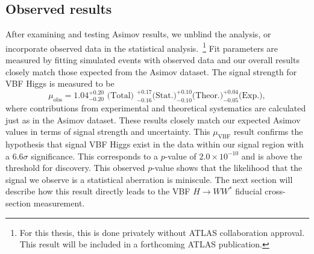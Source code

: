 \subsection{Observed results}
After examining and testing Asimov results, we unblind the analysis, or incorporate observed data in the statistical analysis.~\footnote{For this thesis, this is done privately without ATLAS collaboration approval. This result will be included in a forthcoming ATLAS publication.} Fit parameters are measured by fitting simulated events with observed data and our overall results closely match those expected from the Asimov dataset. The signal strength for VBF Higgs is measured to be
\begin{equation}
\mu_{\text{obs}} = 1.04 ^{+0.20}_{-0.20} \text{ (Total) } ^{+0.17}_{-0.16} \text{(Stat.)} ^{+0.10}_{-0.10} \text{(Theor.)} ^{+0.04}_{-0.05} \text{(Exp.)},
\end{equation}
where contributions from experimental and theoretical systematics are  calculated just as in the Asimov dataset. These results closely match our expected Asimov values in terms of signal strength and uncertainty. This $\mu_\text{VBF}$ result confirms the hypothesis that signal VBF Higgs exist in the data within our signal region with a 6.6$\sigma$ significance. This corresponds to a $p$-value of $2.0\times10^{-10}$ and is above the threshold for discovery. This observed $p$-value shows that the likelihood that the signal we observe is a statistical aberration is miniscule. The next section will describe how this result directly leads to the VBF $H\rightarrow WW^*$ fiducial cross-section measurement. 


